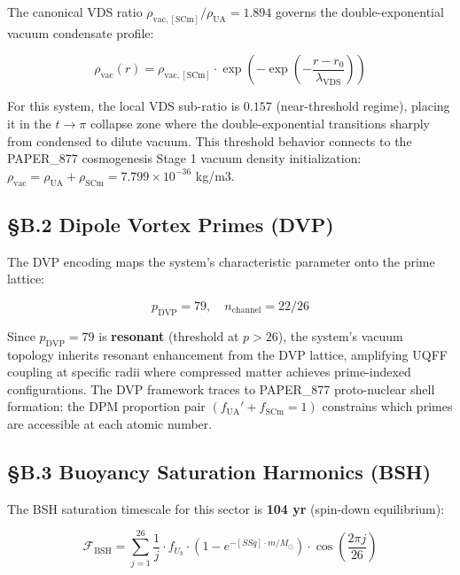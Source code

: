 \documentclass[12pt,a4paper]{article}
\begin{document}
The canonical VDS ratio $\rho_{\mathrm{vac,[SCm]}} / \rho_{\mathrm{UA}} = 1.894$ governs the double-exponential vacuum condensate profile:

\begin{equation}
\rho_{\mathrm{vac}}(r) = \rho_{\mathrm{vac,[SCm]}} \cdot \exp\!\left(-\exp\!\left(-\frac{r - r_0}{\lambda_{\mathrm{VDS}}}\right)\right)
\end{equation}

For this system, the local VDS sub-ratio is $0.157$ (near-threshold regime), placing it in the $t \to \pi$ collapse zone where the double-exponential transitions sharply from condensed to dilute vacuum. This threshold behavior connects to the PAPER\_877 cosmogenesis Stage 1 vacuum density initialization: $\rho_{\mathrm{vac}} = \rho_{\mathrm{UA}} + \rho_{\mathrm{SCm}} = 7.799 \times 10^{-36}$ kg/m3.

\subsection{\S{}B.2 Dipole Vortex Primes (DVP)}

The DVP encoding maps the system's characteristic parameter onto the prime lattice:

\begin{equation}
p_{\mathrm{DVP}} = 79, \quad n_{\mathrm{channel}} = 22/26
\end{equation}

Since $p_{\mathrm{DVP}} = 79$ is \textbf{resonant} (threshold at $p > 26$), the system's vacuum topology inherits resonant enhancement from the DVP lattice, amplifying UQFF coupling at specific radii where compressed matter achieves prime-indexed configurations. The DVP framework traces to PAPER\_877 proto-nuclear shell formation: the DPM proportion pair $(f_{\mathrm{UA}}' + f_{\mathrm{SCm}} = 1)$ constrains which primes are accessible at each atomic number.

\subsection{\S{}B.3 Buoyancy Saturation Harmonics (BSH)}

The BSH saturation timescale for this sector is \textbf{104 yr} (spin-down equilibrium):

\begin{equation}
\mathcal{F}_{\mathrm{BSH}} = \sum_{j=1}^{26} \frac{1}{j} \cdot f_U_b \cdot \left(1 - e^{-[SSq] \cdot m/M_\odot}\right) \cdot \cos\!\left(\frac{2\pi j}{26}\right)
\end{equation}
\end{document}
